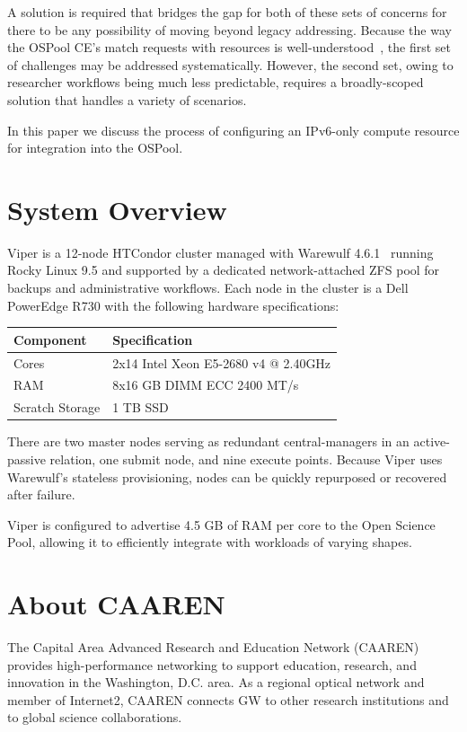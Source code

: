 \documentclass[11pt]{article}
\begin{document}
A solution is required that bridges the gap for both of these sets of concerns for there to be any possibility of moving beyond legacy addressing. Because the way the OSPool CE's match requests with resources is well-understood~\cite{ospooldocs}, the first set of challenges may be addressed systematically. However, the second set, owing to researcher workflows being much less predictable, requires a broadly-scoped solution that handles a variety of scenarios. 

In this paper we discuss the process of configuring an IPv6-only compute resource for integration into the OSPool.

\section{System Overview}

Viper is a 12-node HTCondor cluster managed with Warewulf 4.6.1~\cite{warewulf} running Rocky Linux 9.5 and supported by a dedicated network-attached ZFS pool for backups and administrative workflows.  Each node in the cluster is a Dell PowerEdge R730 with the following hardware specifications:

\begin{center}
\small
\begin{tabular}{|l|l|}
\hline
\textbf{Component} & \textbf{Specification} \\
\hline
Cores & 2x14 Intel Xeon E5-2680 v4 @ 2.40GHz\\
RAM & 8x16 GB DIMM ECC 2400 MT/s \\
Scratch Storage & 1 TB SSD \\
\hline
\end{tabular}
\end{center}
There  are two master nodes serving as redundant central-managers in an active-passive relation, one
submit node, and nine execute points. Because Viper uses Warewulf's stateless provisioning, nodes can be quickly repurposed or recovered after failure.

Viper is configured to advertise 4.5 GB of RAM per core to the Open Science Pool, allowing it to efficiently integrate with workloads of varying shapes.  

\section{About CAAREN}

The Capital Area Advanced Research and Education Network (CAAREN) provides high-performance networking to support education, research, and innovation in the Washington, D.C. area. As a regional optical network and member of Internet2, CAAREN connects GW to other research institutions and to global science collaborations.
\newline
\end{document}
